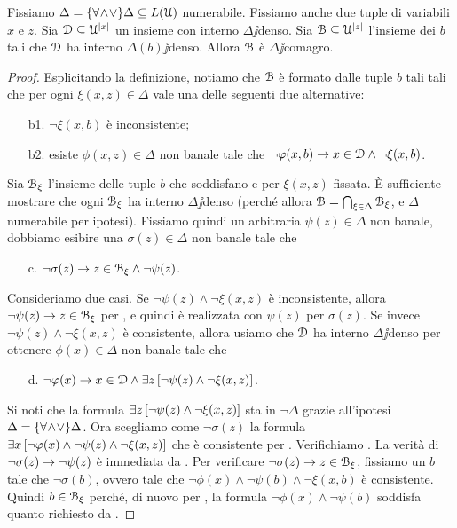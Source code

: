 \begin{lemma}\label{lemmaomissionetipi}
Fissiamo $\Delta=\{\forall\!\wedge\!\vee\}\Delta\subseteq L(\EuScript U)$ numerabile. Fissiamo anche due tuple di variabili $x$ e $z$. Sia $\EuScript D\subseteq\EuScript U^{|x|}$ un insieme con interno $\Delta\jj$denso. Sia $\EuScript B\subseteq\EuScript U^{|z|}$ l'insieme dei $b$ tali che $\EuScript D$ ha interno $\Delta(b)\jj$denso. Allora $\EuScript B$ \`e $\Delta\jj$comagro.
\end{lemma}

\begin{proof} Esplicitando la definizione, notiamo che $\EuScript B$ \`e formato dalle tuple $b$ tali tali che per ogni $\xi(x,z)\in\Delta$ vale una delle seguenti due alternative:\nobreak
\begin{itemize}
\item[b1.]  $\neg\xi(x,b)$ \`e inconsistente;
\item[b2.]  esiste $\phi(x,z)\in\Delta$ non banale tale che $\neg\varphi(x,b)\rightarrow x\in\EuScript D\wedge\neg\xi(x,b)$.
\end{itemize}
Sia $\EuScript B_\xi$ l'insieme delle tuple $b$ che soddisfano  e  per $\xi(x,z)$ fissata. \`E sufficiente mostrare che ogni $\EuScript B_\xi$ ha interno $\Delta\jj$denso (perch\'e allora $\EuScript B=\bigcap_{\xi \in \Delta} \EuScript B_\xi$, e $\Delta$ numerabile per ipotesi). Fissiamo quindi un arbitraria $\psi(z)\in\Delta$ non banale, dobbiamo esibire una $\sigma(z)\in\Delta$ non banale tale che
\begin{itemize}
 \item[c.] $\neg\sigma(z)\rightarrow z\in\EuScript B_\xi\wedge\neg\psi(z)$.
\end{itemize}  
Consideriamo due casi. Se $\neg\psi(z)\wedge\neg\xi(x,z)$ \`e inconsistente, allora $\neg\psi(z)\rightarrow z\in\EuScript B_\xi$ per , e quindi  \`e realizzata con $\psi(z)$ per $\sigma(z)$. Se invece $\neg\psi(z)\wedge\neg\xi(x,z)$ \`e consistente, allora usiamo che $\EuScript D$ ha interno $\Delta\jj$denso per ottenere $\phi(x)\in\Delta$ non banale tale che 
\begin{itemize}
\item[d.] $\neg\varphi(x)\rightarrow  x\in\EuScript D\wedge\exists z\,[\neg\psi(z)\wedge\neg\xi(x,z)]$.
\end{itemize} 
Si noti che la formula $\exists z\,[\neg\psi(z)\wedge\neg\xi(x,z)]$ sta in $\neg\Delta$ grazie all'ipotesi $\Delta=\{\forall\!\wedge\!\vee\}\Delta$.
Ora scegliamo come $\neg\sigma(z)$ la formula $\exists x\,[\neg\varphi(x)\wedge\neg\psi(z)\wedge\neg\xi(x,z)]$ che \`e consistente per . Verifichiamo . La verit\`a di $\neg\sigma(z)\rightarrow \neg\psi(z)$ \`e immediata da . Per verificare $\neg\sigma(z)\rightarrow z\in\EuScript B_\xi$, fissiamo un $b$ tale che $\neg\sigma(b)$, ovvero tale che $\neg\phi(x)\wedge\neg\psi(b)\wedge\neg\xi(x,b)$ \`e consistente. Quindi $b\in\EuScript B_\xi$ perch\'e, di nuovo per , la formula $\neg\phi(x)\wedge\neg\psi(b)$ soddisfa quanto richiesto da .
\end{proof}

